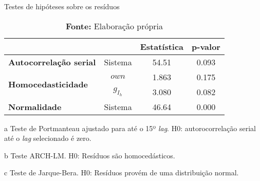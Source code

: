 \begin{table}[H]
\centering
\caption{Testes de hipóteses sobre os resíduos}
\label{testes_resduos}
	\begin{threeparttable}
\begin{tabular}{l|c|c|c}
\hline
\multicolumn{2}{l|}{} & \textbf{Estatística} & \textbf{p-valor} \\ \hline
\textbf{Autocorrelação serial}\tnote{a} & Sistema & 54.51 & 0.093 \\ \hline
\multirow{2}{*}{\textbf{Homocedasticidade}\tnote{b}} & $own$ & 1.863 & 0.175 \\ \cline{2-4} 
 & $g_{I_h}$ & 3.080 & 0.082 \\ \hline
\textbf{Normalidade}\tnote{c} & Sistema & 46.64 & 0.000 \\ \hline
\end{tabular}%
\begin{tablenotes}\footnotesize
	\item [a] Teste de Portmanteau ajustado para até o 15º \textit{lag}. H0: autorocorrelação serial até o \textit{lag} selecionado é zero.
	\item [b] Teste ARCH-LM. H0: Resíduos são homocedásticos.
	\item [c] Teste de Jarque-Bera. H0: Resíduos provém de uma distribuição normal.
\end{tablenotes}
\end{threeparttable}
\caption*{\textbf{Fonte:} Elaboração própria}
\end{table}